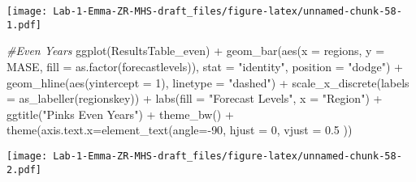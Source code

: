 \documentclass[
]{article}
\newenvironment{Shaded}{\begin{snugshade}}{\end{snugshade}}
\newcommand{\AttributeTok}[1]{\textcolor[rgb]{0.77,0.63,0.00}{#1}}
\newcommand{\CommentTok}[1]{\textcolor[rgb]{0.56,0.35,0.01}{\textit{#1}}}
\newcommand{\DecValTok}[1]{\textcolor[rgb]{0.00,0.00,0.81}{#1}}
\newcommand{\FloatTok}[1]{\textcolor[rgb]{0.00,0.00,0.81}{#1}}
\newcommand{\FunctionTok}[1]{\textcolor[rgb]{0.00,0.00,0.00}{#1}}
\newcommand{\NormalTok}[1]{#1}
\newcommand{\SpecialCharTok}[1]{\textcolor[rgb]{0.00,0.00,0.00}{#1}}
\newcommand{\StringTok}[1]{\textcolor[rgb]{0.31,0.60,0.02}{#1}}
\begin{document}
\texttt{[image: Lab-1-Emma-ZR-MHS-draft\_files/figure-latex/unnamed-chunk-58-1.pdf]}

\begin{Shaded}
\begin{Highlighting}[]
\CommentTok{\#Even Years }
\FunctionTok{ggplot}\NormalTok{(ResultsTable\_even) }\SpecialCharTok{+} 
  \FunctionTok{geom\_bar}\NormalTok{(}\FunctionTok{aes}\NormalTok{(}\AttributeTok{x =}\NormalTok{ regions, }\AttributeTok{y =}\NormalTok{ MASE, }\AttributeTok{fill =} \FunctionTok{as.factor}\NormalTok{(forecastlevels)), }\AttributeTok{stat =} \StringTok{"identity"}\NormalTok{, }\AttributeTok{position =} \StringTok{"dodge"}\NormalTok{) }\SpecialCharTok{+} 
  \FunctionTok{geom\_hline}\NormalTok{(}\FunctionTok{aes}\NormalTok{(}\AttributeTok{yintercept =} \DecValTok{1}\NormalTok{), }\AttributeTok{linetype =} \StringTok{"dashed"}\NormalTok{) }\SpecialCharTok{+} 
  \FunctionTok{scale\_x\_discrete}\NormalTok{(}\AttributeTok{labels =} \FunctionTok{as\_labeller}\NormalTok{(regionskey)) }\SpecialCharTok{+}
  \FunctionTok{labs}\NormalTok{(}\AttributeTok{fill =} \StringTok{"Forecast Levels"}\NormalTok{, }\AttributeTok{x =} \StringTok{"Region"}\NormalTok{) }\SpecialCharTok{+} 
  \FunctionTok{ggtitle}\NormalTok{(}\StringTok{"Pinks Even Years"}\NormalTok{) }\SpecialCharTok{+} \FunctionTok{theme\_bw}\NormalTok{() }\SpecialCharTok{+} \FunctionTok{theme}\NormalTok{(}\AttributeTok{axis.text.x=}\FunctionTok{element\_text}\NormalTok{(}\AttributeTok{angle=}\SpecialCharTok{{-}}\DecValTok{90}\NormalTok{, }\AttributeTok{hjust =} \DecValTok{0}\NormalTok{, }\AttributeTok{vjust =} \FloatTok{0.5}\NormalTok{ ))}
\end{Highlighting}
\end{Shaded}

\texttt{[image: Lab-1-Emma-ZR-MHS-draft\_files/figure-latex/unnamed-chunk-58-2.pdf]}
\end{document}
